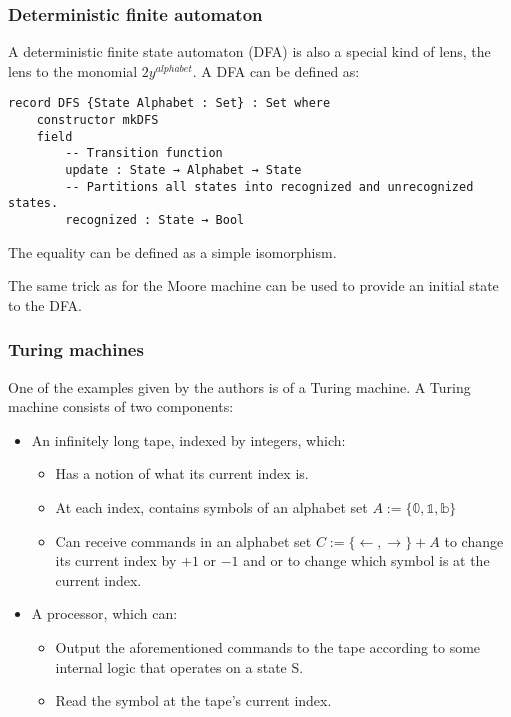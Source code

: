 \subsubsection{Deterministic finite automaton}
A deterministic finite state automaton (DFA) is also a special kind of lens, the lens to the monomial $2y^{alphabet}$. A DFA can be defined as:
\begin{verbatim}
record DFS {State Alphabet : Set} : Set where
    constructor mkDFS
    field
        -- Transition function
        update : State → Alphabet → State
        -- Partitions all states into recognized and unrecognized states.
        recognized : State → Bool
\end{verbatim}

The equality can be defined as a simple isomorphism.

The same trick as for the Moore machine can be used to provide an initial state to the DFA.


\subsubsection{Turing machines}

One of the examples given by the authors is of a Turing machine. A Turing machine consists of two components:
\begin{itemize}
    \item An infinitely long tape, indexed by integers, which: \begin{itemize}
        \item Has a notion of what its current index is.
        \item At each index, contains symbols of an alphabet set $A := \{\mathbb{0}, \mathbb{1}, \mathbb{b}\}$ 
        \item Can receive commands in an alphabet set $C := \{\leftarrow, \rightarrow\} + A$ to change its current index by $+1$ or $-1$ and or to change which symbol is at the current index.
    \end{itemize}
    \item A processor, which can:
    \begin{itemize}
        \item Output the aforementioned commands to the tape according to some internal logic that operates on a state S.
        \item Read the symbol at the tape's current index.
    \end{itemize}
\end{itemize}

